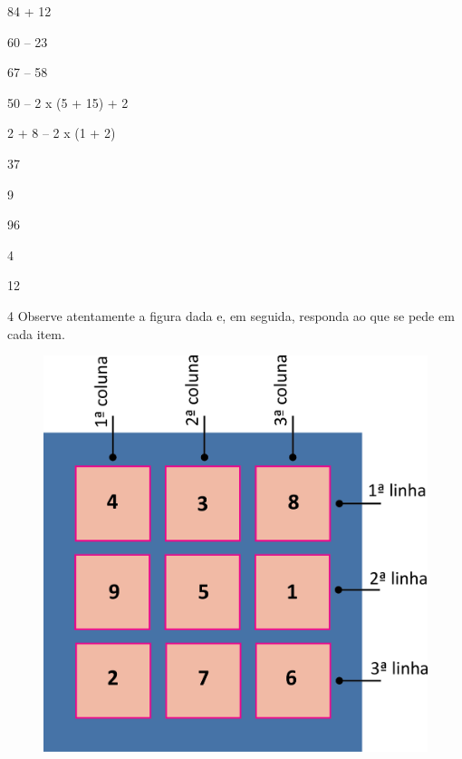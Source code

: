 \begin{multicols}{2}
84 + 12

60 -- 23

67 -- 58

50 -- 2 x (5 + 15) + 2

2 + 8 -- 2 x (1 + 2)

37

9

96

4

12
\end{multicols}

\num{4} Observe atentamente a figura dada e, em seguida, responda ao que se pede em cada item.


\begin{figure}[htpb!]
\centering
\includegraphics[width=.5\textwidth]{./media/image14.png}
\end{figure}

